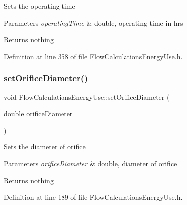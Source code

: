 Sets the operating time


\begin{DoxyParams}{Parameters}
{\em operating\+Time} & double, operating time in hrs\\
\hline
\end{DoxyParams}
\begin{DoxyReturn}{Returns}
nothing 
\end{DoxyReturn}


Definition at line 358 of file Flow\+Calculations\+Energy\+Use.\+h.

\mbox{\label{class_flow_calculations_energy_use_a31116dc6381ad3fd9d2214da7ee3dd1b}} 
\subsubsection{\texorpdfstring{set\+Orifice\+Diameter()}{setOrificeDiameter()}\hspace{0.1cm}{\footnotesize\ttfamily [1/3]}}
{\footnotesize\ttfamily void Flow\+Calculations\+Energy\+Use\+::set\+Orifice\+Diameter (\begin{DoxyParamCaption}\item[{double}]{orifice\+Diameter }\end{DoxyParamCaption})\hspace{0.3cm}{\ttfamily [inline]}}

Sets the diameter of orifice


\begin{DoxyParams}{Parameters}
{\em orifice\+Diameter} & double, diameter of orifice\\
\hline
\end{DoxyParams}
\begin{DoxyReturn}{Returns}
nothing 
\end{DoxyReturn}


Definition at line 189 of file Flow\+Calculations\+Energy\+Use.\+h.

\mbox{\label{class_flow_calculations_energy_use_a31116dc6381ad3fd9d2214da7ee3dd1b}} 
